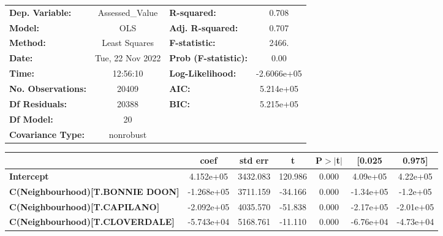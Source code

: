 \documentclass{report}
\begin{document}
\begin{center}
\begin{tabular}{lclc}
\toprule
\textbf{Dep. Variable:}                      & Assessed\_Value  & \textbf{  R-squared:         } &      0.708   \\
\textbf{Model:}                              &       OLS        & \textbf{  Adj. R-squared:    } &      0.707   \\
\textbf{Method:}                             &  Least Squares   & \textbf{  F-statistic:       } &      2466.   \\
\textbf{Date:}                               & Tue, 22 Nov 2022 & \textbf{  Prob (F-statistic):} &      0.00    \\
\textbf{Time:}                               &     12:56:10     & \textbf{  Log-Likelihood:    } & -2.6066e+05  \\
\textbf{No. Observations:}                   &       20409      & \textbf{  AIC:               } &  5.214e+05   \\
\textbf{Df Residuals:}                       &       20388      & \textbf{  BIC:               } &  5.215e+05   \\
\textbf{Df Model:}                           &          20      & \textbf{                     } &              \\
\textbf{Covariance Type:}                    &    nonrobust     & \textbf{                     } &              \\
\bottomrule
\end{tabular}
\begin{tabular}{lcccccc}
                                             & \textbf{coef} & \textbf{std err} & \textbf{t} & \textbf{P$> |$t$|$} & \textbf{[0.025} & \textbf{0.975]}  \\
\midrule
\textbf{Intercept}                           &    4.152e+05  &     3432.083     &   120.986  &         0.000        &     4.09e+05    &     4.22e+05     \\
\textbf{C(Neighbourhood)[T.BONNIE DOON]}     &   -1.268e+05  &     3711.159     &   -34.166  &         0.000        &    -1.34e+05    &     -1.2e+05     \\
\textbf{C(Neighbourhood)[T.CAPILANO]}        &   -2.092e+05  &     4035.570     &   -51.838  &         0.000        &    -2.17e+05    &    -2.01e+05     \\
\textbf{C(Neighbourhood)[T.CLOVERDALE]}      &   -5.743e+04  &     5168.761     &   -11.110  &         0.000        &    -6.76e+04    &    -4.73e+04     \\

\end{tabular}
\end{center}
\end{document}
